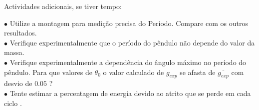 \documentclass[a4paper,12pt]{article}      %
\begin{document}
Actividades adicionais, se tiver tempo:
 \begin{flushleft}
	 $\bullet$ Utilize a montagem para medição precisa do Periodo. Compare com os outros resultados.\\
	 $\bullet$ Verifique experimentalmente que o período do pêndulo não depende do valor da massa.\\
	 $\bullet$ Verifique experimentalmente a dependência do ângulo máximo no período do pêndulo. 
	 Para que valores de $\theta_0$ o valor calculado de $g_{exp}$ se afasta de $\overline{g_{exp}}$ com desvio de $0.05$ ?\\
	 $\bullet$ Tente estimar a percentagem de energia devido ao atrito que se perde em cada ciclo .
\end{flushleft} 

 


\end{document}
